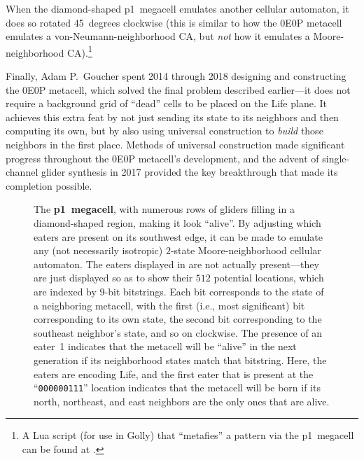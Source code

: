 When the diamond-shaped p1~megacell emulates another cellular automaton, it does so rotated 45~degrees clockwise (this is similar to how the 0E0P metacell emulates a von-Neumann-neighborhood CA, but \emph{not} how it emulates a Moore-neighborhood CA).\footnote{A Lua script (for use in Golly) that ``metafies'' a pattern via the p1~megacell can be found at .}

Finally, Adam P.~Goucher spent 2014 through 2018 designing and constructing the 0E0P metacell, which solved the final problem described earlier---it does not require a background grid of ``dead'' cells to be placed on the Life plane. It achieves this extra feat by not just sending its state to its neighbors and then computing its own, but by also using universal construction to \emph{build} those neighbors in the first place. Methods of universal construction made significant progress throughout the 0E0P metacell's development, and the advent of single-channel glider synthesis in 2017 provided the key breakthrough that made its completion possible.


\clearpage


\begin{figure}[!htb]
	\centering
	\caption{The \textbf{p1~megacell}, with numerous rows of gliders filling in a diamond-shaped region, making it look ``alive''. By adjusting which eaters are present on its southwest edge, it can be made to emulate any (not necessarily isotropic) $2$-state Moore-neighborhood cellular automaton. The eaters displayed in  are not actually present---they are just displayed so as to show their $512$ potential locations, which are indexed by $9$-bit bitstrings. Each bit corresponds to the state of a neighboring metacell, with the first (i.e., most significant) bit corresponding to its own state, the second bit corresponding to the southeast neighbor's state, and so on clockwise. The presence of an eater~1 indicates that the metacell will be ``alive'' in the next generation if its neighborhood states match that bitstring. Here, the eaters are encoding Life, and the first eater that is present at the ``\texttt{000000111}'' location indicates that the metacell will be born if its north, northeast, and east neighbors are the only ones that are alive.}
	\label{fig:p1_megacell}
\end{figure}

